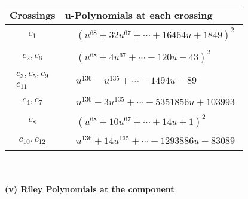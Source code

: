\documentclass[1p]{elsarticle_modified}
\theoremstyle{definition}
\begin{document}
\begin{tabular}{m{50pt}|m{274pt}}
Crossings & \hspace{64pt}u-Polynomials at each crossing \\
\hline $$\begin{aligned}c_{1}\end{aligned}$$&$\begin{aligned}
&(u^{68}+32 u^{67}+\cdots+16464 u+1849)^{2}
\end{aligned}$\\
\hline $$\begin{aligned}c_{2},c_{6}\end{aligned}$$&$\begin{aligned}
&(u^{68}+4 u^{67}+\cdots-120 u-43)^{2}
\end{aligned}$\\
\hline $$\begin{aligned}c_{3},c_{5},c_{9}\\c_{11}\end{aligned}$$&$\begin{aligned}
&u^{136}- u^{135}+\cdots-1494 u-89
\end{aligned}$\\
\hline $$\begin{aligned}c_{4},c_{7}\end{aligned}$$&$\begin{aligned}
&u^{136}-3 u^{135}+\cdots-5351856 u+103993
\end{aligned}$\\
\hline $$\begin{aligned}c_{8}\end{aligned}$$&$\begin{aligned}
&(u^{68}+10 u^{67}+\cdots+14 u+1)^{2}
\end{aligned}$\\
\hline $$\begin{aligned}c_{10},c_{12}\end{aligned}$$&$\begin{aligned}
&u^{136}+14 u^{135}+\cdots-1293886 u-83089
\end{aligned}$\\
\hline
\end{tabular}\\~\\
\newpage\renewcommand{\arraystretch}{1}
\flushleft \textbf{(v) Riley Polynomials at the component}\newline \\
\end{document}
